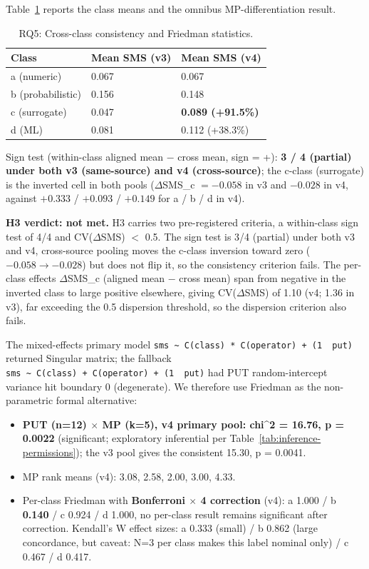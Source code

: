 \documentclass[review,12pt,authoryear]{elsarticle}
\providecommand{\tightlist}{\setlength{\itemsep}{0pt}\setlength{\parskip}{0pt}}
\begin{document}
Table~\ref{tab:p2-12} reports the class means and the omnibus
MP-differentiation result.
{\def\LTcaptype{table} %
\begin{longtable}[]{@{}lll@{}}
\caption{RQ5: Cross-class consistency and Friedman statistics.}\label{tab:p2-12}\\
\toprule\noalign{}
Class & Mean SMS (v3) & Mean SMS (v4) \\
\midrule\noalign{}
\endfirsthead
\endhead
\bottomrule\noalign{}
\endlastfoot
a (numeric) & 0.067 & 0.067 \\
b (probabilistic) & 0.156 & 0.148 \\
c (surrogate) & 0.047 & \textbf{0.089 (+91.5\%)} \\
d (ML) & 0.081 & 0.112 (+38.3\%) \\
\end{longtable}
}

Sign test (within-class aligned mean − cross mean, sign = +): \textbf{3
/ 4 (partial) under both v3 (same-source) and v4 (cross-source)}; the
c-class (surrogate) is the inverted cell in both pools ($\Delta$SMS\_c
$= -0.058$ in v3 and $-0.028$ in v4, against $+0.333$ / $+0.093$ /
$+0.149$ for a / b / d in v4).

\textbf{H3 verdict: not met.} H3 carries two pre-registered criteria, a
within-class sign test of 4/4 and CV($\Delta$SMS) $<$ 0.5. The sign test
is 3/4 (partial) under both v3 and v4, cross-source pooling moves the
c-class inversion toward zero ($-0.058 \to -0.028$) but does not
flip it, so the consistency criterion fails. The
per-class effects $\Delta$SMS\_c (aligned mean $-$ cross mean) span from
negative in the inverted class to large positive elsewhere, giving
CV($\Delta$SMS) of 1.10 (v4; 1.36 in v3), far exceeding the 0.5 dispersion threshold,
so the dispersion criterion also fails.

The mixed-effects primary model
\texttt{sms\ \textasciitilde{}\ C(class)\ *\ C(operator)\ +\ (1\ \textbar{}\ put)}
returned Singular matrix; the fallback
\texttt{sms\ \textasciitilde{}\ C(class)\ +\ C(operator)\ +\ (1\ \textbar{}\ put)}
had PUT random-intercept variance hit boundary 0 (degenerate). We
therefore use Friedman as the non-parametric formal alternative:

\begin{itemize}
\tightlist
\item
  \textbf{PUT (n=12) $\times$ MP (k=5), v4 primary pool: chi\^{}2 = 16.76, p = 0.0022}
  (significant; exploratory inferential per Table~\ref{tab:inference-permissions});
  the v3 pool gives the consistent 15.30, p = 0.0041.
\item
  MP rank means (v4): 3.08, 2.58, 2.00, 3.00, 4.33.
\item
  Per-class Friedman with \textbf{Bonferroni $\times$ 4 correction}
  (v4): a 1.000 / b \textbf{0.140} / c 0.924 / d 1.000, no per-class
  result remains significant after correction. Kendall's W effect sizes:
  a 0.333 (small) / b 0.862 (large concordance, but caveat: N=3 per
  class makes this label nominal only) / c 0.467 / d 0.417.
\end{itemize}
\end{document}
